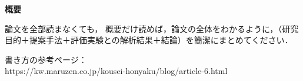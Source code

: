 \clearpage
\begin{center}\thispagestyle{empty}
{\LARGE\bfseries{概要}}
\end{center}

論文を全部読まなくても， 概要だけ読めば，論文の全体をわかるように，（研究目的＋提案手法＋評価実験との解析結果＋結論）を簡潔にまとめてください．

書き方の参考ページ：　\\
https://kw.maruzen.co.jp/kousei-honyaku/blog/article-6.html




\clearpage
\phantom{s}\thispagestyle{empty}
\clearpage

\pagestyle{empty}







